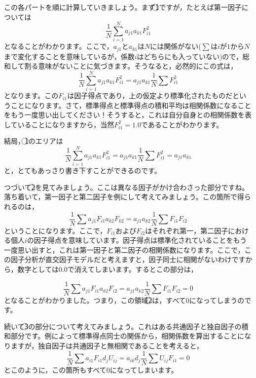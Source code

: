 \documentclass{ltjsbook}
\begin{document}
この各パートを順に計算していきましょう。まず\textcircled{\scriptsize 1}ですが，たとえば第一因子については
\begin{equation}
    \frac{1}{N}\sum_{i=1}^{N}a_{j1}a_{k1}F_{i1}^2
\end{equation}
となることがわかります。ここで，$a_{j1}$と$a_{k1}$は$N$には関係がない($\sum$は$i$が$1$から$N$まで変化することを意味しているが，係数$i$はどちらにも入っていない)ので，総和して割る意味がないことに気づきます。そうなると，必然的にこの式は，
\begin{equation}
    \frac{1}{N}\sum_{i=1}^{N}a_{j1}a_{k1}F_{i1}^2=a_{j1}a_{k1}\frac{1}{N}\sum F_{i1}^2
\end{equation}
となります。この$F_{i1}$は因子得点であり，上の仮定より標準化されたものだということになります。さて，標準得点と標準得点の積和平均は相関係数になることをもう一度思い出してください！そうすると，これは自分自身との相関係数を表していることになりますから，当然$F_{i1}^2=1.0$であることがわかります。

結局，\textcircled{\scriptsize 1}のエリアは
\begin{equation}
    \frac{1}{N}\sum_{i=1}^{N}a_{j1}a_{k1}F_{i1}^2=a_{j1}a_{k1}\frac{1}{N}\sum F_{i1}^2=a_{j1}a_{k1}
\end{equation}
と，とてもあっさり書き下すことができるのです。

つづいて\textcircled{\scriptsize 2}を見てみましょう。ここは異なる因子がかけ合わさった部分ですね。落ち着いて，第一因子と第二因子を例にして考えてみましょう。この箇所で得られるのは，
\begin{equation}
    \frac{1}{N}\sum a_{j1}F_{i1} a_{k2}F_{k2} = a_{j1}a_{k2}\frac{1}{N}\sum F_{i1}F_{i2}
\end{equation}
ということになります。ここで，$F_{i1}$および$F_{i2}$はそれぞれ第一，第二因子における個人$i$の因子得点を意味しています。因子得点は標準化されていることをもう一度思い出すと，これは第一因子と第二因子の相関係数になります。ここで，この因子分析が直交因子モデルだと考えますと，因子同士に相関がないわけですから，数字としては$0.0$で消えてしまいます。するとこの部分は，

\begin{equation}
    \frac{1}{N}\sum a_{j1}F_{i1} a_{k2}F_{i2} = a_{j1}a_{k2}\frac{1}{N}\sum F_{i1}F_{i2}=0
\end{equation}
となることがわかりました。つまり，この領域\textcircled{\scriptsize 2}は，すべて$0$になってしまうのです。


続いて\textcircled{\scriptsize 3}の部分について考えてみましょう。これはある共通因子と独自因子の積和部分です。例によって標準得点同士の関係から，相関係数を算出することになりますが，独自因子は共通因子と無相関であることを考えると，
\begin{equation}
    \frac{1}{N}\sum a_{i1}F_{i1}d_{j}U_{ij}=a_{ik}d_{j} \frac{1}{N}\sum U_{ij}F_{i1} =0
\end{equation}
とこのように，この箇所もすべて$0$になってしまいます。
\end{document}
